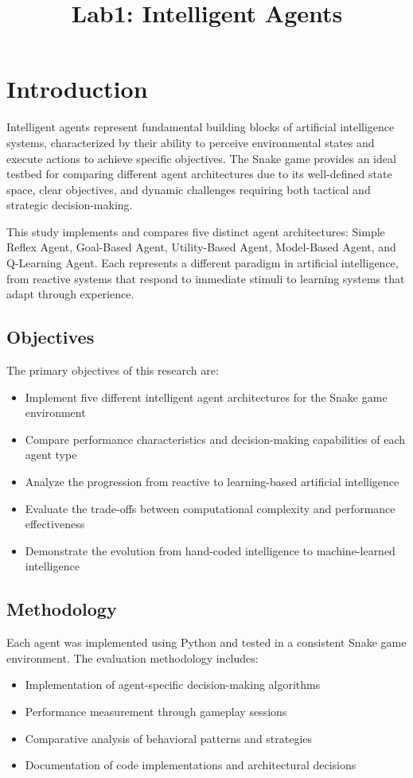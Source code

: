 \documentclass[11pt,a4paper]{article}
\title{Lab1: Intelligent Agents}
\begin{document}
\maketitle

\section{Introduction}

Intelligent agents represent fundamental building blocks of artificial intelligence systems, characterized by their ability to perceive environmental states and execute actions to achieve specific objectives. The Snake game provides an ideal testbed for comparing different agent architectures due to its well-defined state space, clear objectives, and dynamic challenges requiring both tactical and strategic decision-making.

This study implements and compares five distinct agent architectures: Simple Reflex Agent, Goal-Based Agent, Utility-Based Agent, Model-Based Agent, and Q-Learning Agent. Each represents a different paradigm in artificial intelligence, from reactive systems that respond to immediate stimuli to learning systems that adapt through experience.

\subsection{Objectives}

The primary objectives of this research are:
\begin{itemize}
\item Implement five different intelligent agent architectures for the Snake game environment
\item Compare performance characteristics and decision-making capabilities of each agent type
\item Analyze the progression from reactive to learning-based artificial intelligence
\item Evaluate the trade-offs between computational complexity and performance effectiveness
\item Demonstrate the evolution from hand-coded intelligence to machine-learned intelligence
\end{itemize}

\subsection{Methodology}

Each agent was implemented using Python and tested in a consistent Snake game environment. The evaluation methodology includes:
\begin{itemize}
\item Implementation of agent-specific decision-making algorithms
\item Performance measurement through gameplay sessions
\item Comparative analysis of behavioral patterns and strategies
\item Documentation of code implementations and architectural decisions
\end{itemize}
\end{document}
